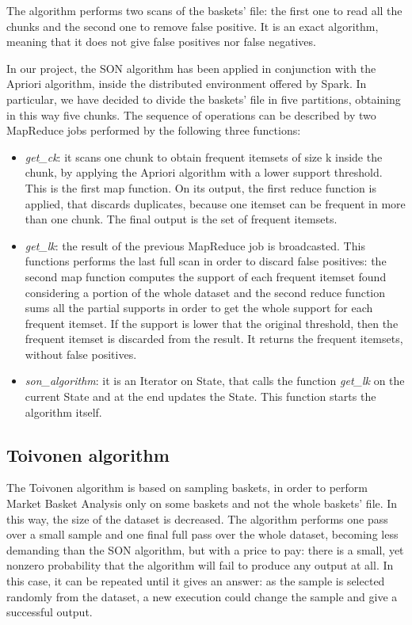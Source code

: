 \documentclass[conference,compsoc]{IEEEtran}
\theoremstyle{definition}
\begin{document}
The algorithm performs two scans of the baskets' file: the first one to read all the chunks and the second one to remove false positive. It is an exact algorithm, meaning that it does not give false positives nor false negatives.

In our project, the SON algorithm has been applied in conjunction with the Apriori algorithm, inside the distributed environment offered by Spark. In particular, we have decided to divide the baskets' file in five partitions, obtaining in this way five chunks. The sequence of operations can be described by two MapReduce jobs performed by the following three functions:
\begin{itemize}
    \item \emph{get\_ck}: it scans one chunk to obtain frequent itemsets of size k inside the chunk, by applying the Apriori algorithm with a lower support threshold. This is the first map function. On its output, the first reduce function is applied, that discards duplicates, because one itemset can be frequent in more than one chunk. The final output is the set of frequent itemsets.
    \item \emph{get\_lk}: the result of the previous MapReduce job is broadcasted. This functions performs the last full scan in order to discard false positives: the second map function computes the support of each frequent itemset found considering a portion of the whole dataset and the second reduce function sums all the partial supports in order to get the whole support for each frequent itemset. If the support is lower that the original threshold, then the frequent itemset is discarded from the result. It returns the frequent itemsets, without false positives. 
    \item \emph{son\_algorithm}: it is an Iterator on State, that calls the function \emph{get\_lk} on the current State and at the end updates the State. This function starts the algorithm itself.
\end{itemize}

\subsection{Toivonen algorithm}

The Toivonen algorithm is based on sampling baskets, in order to perform Market Basket Analysis only on some baskets and not the whole baskets' file. In this way, the size of the dataset is decreased. The algorithm performs one pass over a small sample and one final full pass over the whole dataset, becoming less demanding than the SON algorithm, but with a price to pay: there is a small, yet nonzero probability that the algorithm will fail to produce any output at all. In this case, it can be repeated until it gives an answer: as the sample is selected randomly from the dataset, a new execution could change the sample and give a successful output. 
\end{document}
